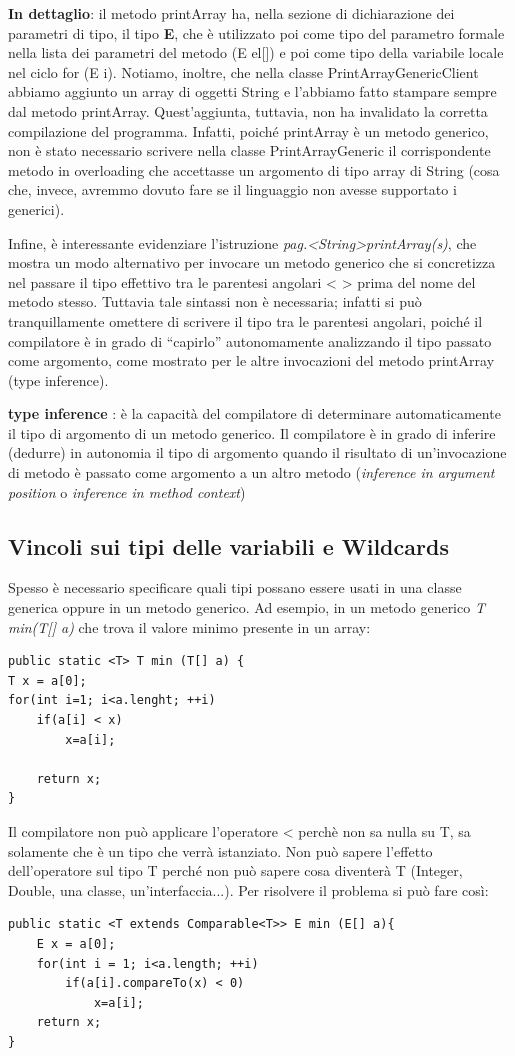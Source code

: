 \textbf{In dettaglio}:  il metodo printArray ha, nella sezione di dichiarazione dei parametri di tipo, il tipo \textbf{E}, che è utilizzato poi come tipo del parametro formale nella lista dei parametri del metodo (E el[]) e poi come tipo della variabile locale nel ciclo for (E i). Notiamo, inoltre, che nella classe PrintArrayGenericClient abbiamo aggiunto un array di oggetti String e l’abbiamo fatto stampare sempre dal metodo printArray. Quest’aggiunta, tuttavia, non ha invalidato la corretta compilazione del programma.
Infatti, poiché printArray è un metodo generico, non è stato necessario scrivere nella classe PrintArrayGeneric il corrispondente metodo in overloading che accettasse un argomento di tipo array di String (cosa che, invece, avremmo dovuto fare se il linguaggio non avesse supportato i generici).

Infine, è interessante evidenziare l’istruzione \textit{pag.<String>printArray(s)}, che mostra un modo alternativo per invocare un metodo generico che si concretizza nel passare il tipo effettivo tra le parentesi angolari < > prima del nome del metodo stesso. Tuttavia tale sintassi non è necessaria; infatti si può tranquillamente omettere di scrivere il tipo tra le parentesi angolari, poiché il compilatore è in grado di “capirlo” autonomamente analizzando il tipo passato come argomento, come mostrato per le altre invocazioni del metodo printArray (type inference).

\textbf{type inference} : è la capacità del compilatore di determinare automaticamente il tipo di argomento di un metodo generico. Il compilatore è in grado di inferire (dedurre) in autonomia il tipo di argomento quando il risultato di un'invocazione di metodo è passato come argomento a un altro metodo (\textit{inference in argument position} o \textit{inference in method context})

\subsection{Vincoli sui tipi delle variabili e Wildcards}
Spesso è necessario specificare quali tipi possano essere usati in una classe generica oppure in un metodo generico. Ad esempio, in un metodo generico \textit{T min(T[] a)} che trova il valore minimo presente in un array:


\begin{lstlisting}
public static <T> T min (T[] a) {
T x = a[0];
for(int i=1; i<a.lenght; ++i) 
	if(a[i] < x) 
		x=a[i];
		
	return x;
}
\end{lstlisting}
Il compilatore non può applicare l'operatore < perchè non sa nulla su T, sa solamente che è un tipo che verrà istanziato. Non può sapere l’effetto dell’operatore sul tipo T perché non può sapere cosa diventerà T (Integer, Double, una classe, un’interfaccia...). Per risolvere il problema si può fare così:

\begin{lstlisting}
public static <T extends Comparable<T>> E min (E[] a){
	E x = a[0];
	for(int i = 1; i<a.length; ++i)
		if(a[i].compareTo(x) < 0)
			x=a[i];
	return x;
}
\end{lstlisting}


